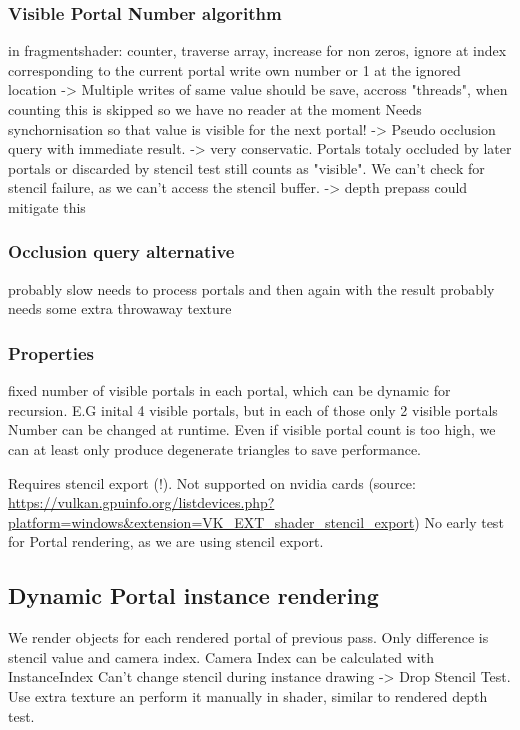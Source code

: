 \subsubsection{Visible Portal Number algorithm}
in fragmentshader: counter, traverse array, increase for non zeros, ignore at index corresponding to the current portal
write own number or 1 at the ignored location -> Multiple writes of same value should be save, accross "threads", when counting this is skipped so we have no reader at the moment
Needs synchornisation so that value is visible for the next portal!
-> Pseudo occlusion query with immediate result.
-> very conservatic. Portals totaly occluded by later portals or discarded by stencil test still counts as "visible". We can't check for stencil failure, as we can't access the stencil buffer.
-> depth prepass could mitigate this

\subsubsection{Occlusion query alternative}
probably slow
needs to process portals and then again with the result
probably needs some extra throwaway texture

\subsubsection{Properties}
fixed number of visible portals in each portal, which can be dynamic for recursion. E.G inital 4 visible portals, but in each of those only 2 visible portals
Number can be changed at runtime.
Even if visible portal count is too high, we can at least only produce degenerate triangles to save performance.

Requires stencil export (!). Not supported on nvidia cards (source: \url{https://vulkan.gpuinfo.org/listdevices.php?platform=windows&extension=VK_EXT_shader_stencil_export})
No early test for Portal rendering, as we are using stencil export.



\subsection{Dynamic Portal instance rendering}
We render objects for each rendered portal of previous pass. Only difference is stencil value and camera index.
Camera Index can be calculated with InstanceIndex
Can't change stencil during instance drawing -> Drop Stencil Test. Use extra texture an perform it manually in shader, similar to rendered depth test. 

